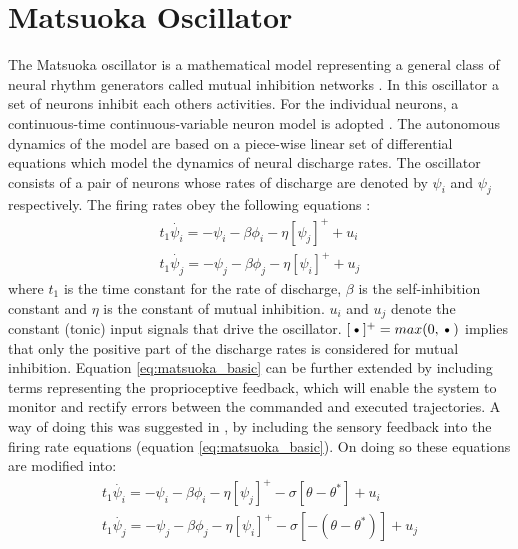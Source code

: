 \documentclass[12pt,twoside]{article}
\theoremstyle{plain}
\theoremstyle{definition}
\theoremstyle{remark}
\begin{document}
\section{Matsuoka Oscillator}
\label{sec:Matsuoka_Oscillator}
The Matsuoka oscillator is a mathematical model representing a general class of neural rhythm generators called mutual inhibition networks \cite{Matsuoka1987}. In this oscillator a set of neurons inhibit each others activities. For the individual neurons, a continuous-time continuous-variable neuron model is adopted \cite{Matsuoka1987}. The autonomous dynamics of the model are based on a piece-wise linear set of differential equations which model the dynamics of neural discharge rates. The oscillator consists of a pair of neurons whose rates of discharge are denoted by $\psi_i$ and $\psi_j$ respectively. The firing rates obey the following equations \cite{Ronsse2009}: 
\begin{subequations} 
\label{eq:matsuoka_basic}
\begin{align}
 t_1 \dot{\psi_i}=-\psi_i - \beta \phi_i - \eta [\psi_j]^+ + u_i\\
 t_1 \dot{\psi_j}=-\psi_j - \beta \phi_j - \eta [\psi_i]^+ + u_j
 \end{align}
\end{subequations}
where $t_1$ is the time constant for the rate of discharge, $\beta$ is the self-inhibition constant and $\eta$ is the constant of mutual inhibition. $u_i$ and $u_j$ denote the constant (tonic) input signals that drive the oscillator. $[\textbf{\textbullet}]^+=max(0,\textbf{\textbullet})$ implies that only the positive part of the discharge rates is considered for mutual inhibition. Equation  \ref{eq:matsuoka_basic} can be further extended by including terms representing the proprioceptive feedback, which will enable the system to monitor and rectify errors between the commanded and executed trajectories. A way of doing this was suggested in \cite{Williamson1998}, by including the sensory feedback into the firing rate equations (equation \ref{eq:matsuoka_basic}). On doing so these equations are modified into:
\begin{subequations} 
\label{eq:matsuoka_extended}
\begin{align}
 t_1 \dot{\psi_i}=-\psi_i - \beta \phi_i - \eta [\psi_j]^+ - \sigma [\theta - \theta^{*}] + u_i\\
 t_1 \dot{\psi_j}=-\psi_j - \beta \phi_j - \eta [\psi_i]^+ - \sigma [-(\theta - \theta^{*})] + u_j
 \end{align}
\end{subequations}
\end{document}
